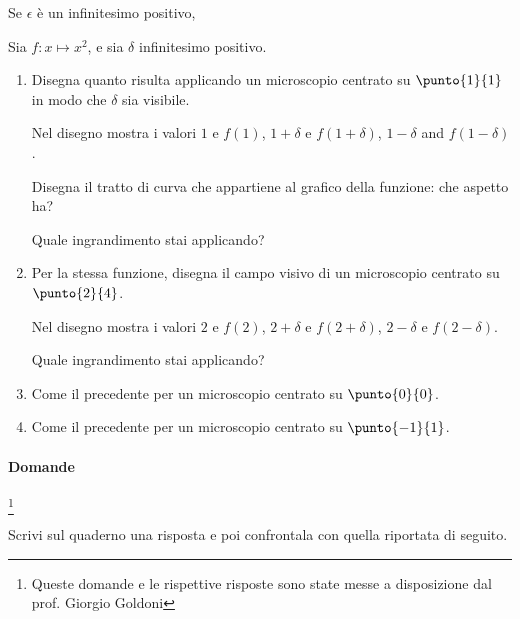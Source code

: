 \begin{esercizio}
 Se $\epsilon$ è un infinitesimo positivo, 
\end{esercizio}

\begin{esercizio}
Sia $f:x\mapsto x^2$,  e sia $\delta$ infinitesimo positivo.

\begin{enumerate} [noitemsep]
\item Disegna quanto risulta applicando un microscopio centrato su $\punto{1}{1}$
in modo che $\delta$ sia visibile.

Nel disegno mostra i valori $1$ e $f(1)$,  $1+\delta$ e 
$f(1+\delta)$,  $1-\delta$ and $f(1-\delta)$.

Disegna il tratto di curva che appartiene al grafico della funzione: che 
aspetto ha?

Quale ingrandimento stai applicando?

\item Per la stessa funzione, disegna il campo visivo di un microscopio
centrato su $\punto{2}{4}$.

Nel disegno mostra i valori $2$ e $f(2)$, $2+\delta$ e $f(2+\delta)$, 
$2-\delta$ e $f(2-\delta)$.

Quale ingrandimento stai applicando?

\item Come il precedente per un microscopio centrato su $\punto {0}{0}$.
\item Come il precedente per un microscopio centrato su $\punto {-1}{1}$.
\end{enumerate}
\end{esercizio}




\paragraph{Domande}
\footnote{Queste domande e le rispettive risposte sono state messe a 
disposizione dal prof. Giorgio Goldoni}

Scrivi sul quaderno una risposta e poi confrontala con quella riportata
di seguito.

